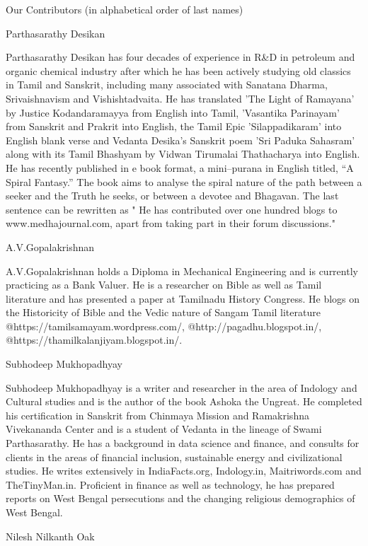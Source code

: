 
Our Contributors (in alphabetical order of last names)\label{contributors}

Parthasarathy Desikan

Parthasarathy Desikan has four decades of experience in R\&D in petroleum and organic chemical industry after which he has been actively studying old classics in Tamil and Sanskrit, including many associated with Sanatana Dharma, Srivaishnavism and Vishishtadvaita. He has translated 'The Light of Ramayana' by Justice Kodandaramayya from English into Tamil, 'Vasantika Parinayam' from Sanskrit and Prakrit into English, the Tamil Epic 'Silappadikaram' into English blank verse and Vedanta Desika’s Sanskrit poem 'Sri Paduka Sahasram' along with its Tamil Bhashyam by Vidwan Tirumalai Thathacharya into English. He has recently published in e book format, a mini–purana in English titled, “A Spiral Fantasy.” The book aims to analyse the spiral nature of the path between a seeker and the Truth he seeks, or between a devotee and Bhagavan. The last sentence can be rewritten as " He has contributed over one hundred blogs to www.medhajournal.com, apart from taking part in their forum discussions."

A.V.Gopalakrishnan

A.V.Gopalakrishnan holds a Diploma in Mechanical Engineering and is currently practicing as a Bank Valuer. He is a researcher on Bible as well as Tamil literature and has presented a paper at Tamilnadu History Congress. He blogs on the Historicity of Bible and the Vedic nature of Sangam Tamil literature @https://tamilsamayam.wordpress.com/, @http://pagadhu.blogspot.in/, @https://thamilkalanjiyam.blogspot.in/.

Subhodeep Mukhopadhyay

Subhodeep Mukhopadhyay is a writer and researcher in the area of Indology and Cultural studies and is the author of the book Ashoka the Ungreat. He completed his certification in Sanskrit from Chinmaya Mission and Ramakrishna Vivekananda Center and is a student of Vedanta in the lineage of Swami Parthasarathy. He has a background in data science and finance, and consults for clients in the areas of financial inclusion, sustainable energy and civilizational studies. He writes extensively in IndiaFacts.org, Indology.in, Maitriwords.com and TheTinyMan.in. Proficient in finance as well as technology, he has prepared reports on West Bengal persecutions and the changing religious demographics of West Bengal. 

Nilesh Nilkanth Oak

